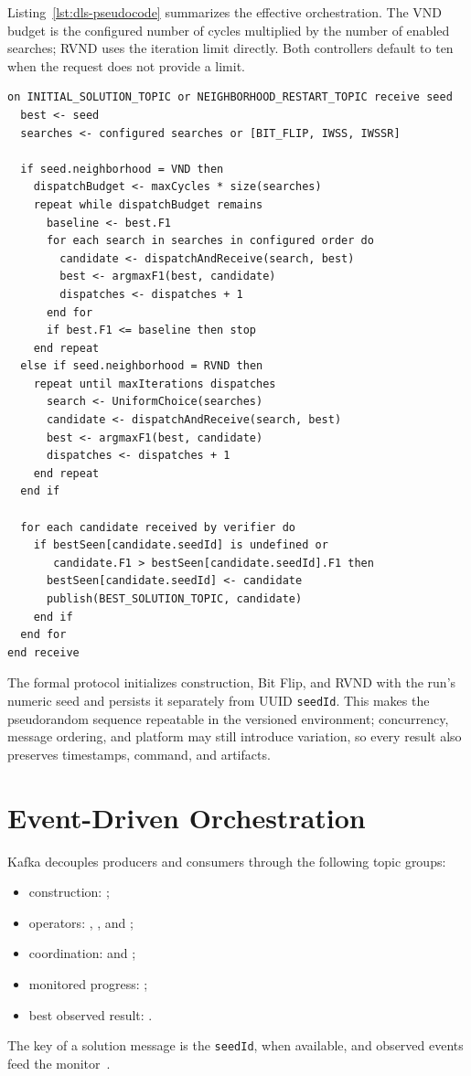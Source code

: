 Listing~\ref{lst:dls-pseudocode} summarizes the effective orchestration. The VND budget is the configured number of cycles multiplied by the number of enabled searches; RVND uses the iteration limit directly. Both controllers default to ten when the request does not provide a limit.

\begin{lstlisting}[caption={Implemented distributed refinement and verification in the DLS.},label={lst:dls-pseudocode},basicstyle=\ttfamily\small,breaklines=true,columns=fullflexible]
on INITIAL_SOLUTION_TOPIC or NEIGHBORHOOD_RESTART_TOPIC receive seed
  best <- seed
  searches <- configured searches or [BIT_FLIP, IWSS, IWSSR]

  if seed.neighborhood = VND then
    dispatchBudget <- maxCycles * size(searches)
    repeat while dispatchBudget remains
      baseline <- best.F1
      for each search in searches in configured order do
        candidate <- dispatchAndReceive(search, best)
        best <- argmaxF1(best, candidate)
        dispatches <- dispatches + 1
      end for
      if best.F1 <= baseline then stop
    end repeat
  else if seed.neighborhood = RVND then
    repeat until maxIterations dispatches
      search <- UniformChoice(searches)
      candidate <- dispatchAndReceive(search, best)
      best <- argmaxF1(best, candidate)
      dispatches <- dispatches + 1
    end repeat
  end if

  for each candidate received by verifier do
    if bestSeen[candidate.seedId] is undefined or
       candidate.F1 > bestSeen[candidate.seedId].F1 then
      bestSeen[candidate.seedId] <- candidate
      publish(BEST_SOLUTION_TOPIC, candidate)
    end if
  end for
end receive
\end{lstlisting}

The formal protocol initializes construction, Bit Flip, and RVND with the run's numeric seed and persists it separately from UUID \texttt{seedId}. This makes the pseudorandom sequence repeatable in the versioned environment; concurrency, message ordering, and platform may still introduce variation, so every result also preserves timestamps, command, and artifacts.

\section{Event-Driven Orchestration}

Kafka decouples producers and consumers through the following topic groups:
\begin{itemize}
  \item construction: ;
  \item operators: , , and ;
  \item coordination:  and ;
  \item monitored progress: ;
  \item best observed result: .
\end{itemize}
The key of a solution message is the \texttt{seedId}, when available, and observed events feed the monitor~\cite{Kreps2011}.

